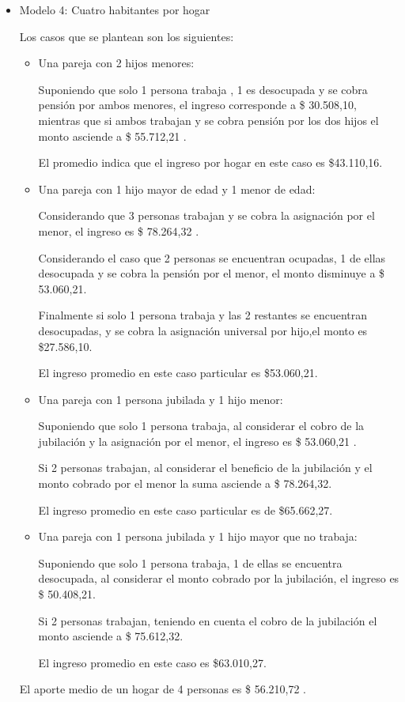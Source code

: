 \begin{itemize}
\item Modelo 4: Cuatro habitantes por hogar

Los casos que se plantean son los siguientes:
\begin{itemize}
\item Una pareja con 2 hijos menores:

Suponiendo que solo 1 persona trabaja , 1 es desocupada y se cobra pensión por ambos menores, el ingreso corresponde a \$ 30.508,10, mientras que si ambos trabajan y se cobra pensión por los dos hijos el monto asciende a \$ 55.712,21 . 

El promedio indica que el ingreso por hogar en este caso es \$43.110,16.

\item Una pareja con 1 hijo mayor de edad y 1 menor de edad:

Considerando que 3 personas trabajan y se cobra la asignación por el menor, el ingreso es \$ 78.264,32 .

Considerando el caso que 2 personas se encuentran ocupadas, 1 de ellas desocupada y se cobra la pensión por el menor, el monto disminuye a \$ 53.060,21. 

Finalmente si solo 1 persona trabaja y las 2 restantes se encuentran desocupadas, y se cobra la asignación universal por hijo,el monto es \$27.586,10. 

El ingreso promedio en este caso particular es \$53.060,21.

\item Una pareja con 1 persona jubilada y 1 hijo menor:

Suponiendo que solo 1 persona trabaja, al considerar el cobro de la jubilación y la asignación por el menor, el ingreso es \$ 53.060,21 .

Si 2 personas trabajan, al considerar el beneficio de la jubilación y el monto cobrado por el menor la suma asciende a \$ 78.264,32. 

El ingreso promedio en este caso particular es de \$65.662,27.

\item Una pareja con 1 persona jubilada y 1 hijo mayor que no trabaja:

Suponiendo que solo 1 persona trabaja, 1 de ellas se encuentra desocupada, al considerar el monto cobrado por la jubilación, el ingreso es \$ 50.408,21.

Si 2 personas trabajan, teniendo en cuenta el cobro de la jubilación el monto asciende a \$ 75.612,32. 

El ingreso promedio en este caso es \$63.010,27.
\end{itemize}

El aporte medio de un hogar de 4 personas es  \$ 56.210,72 .


\end{itemize}


